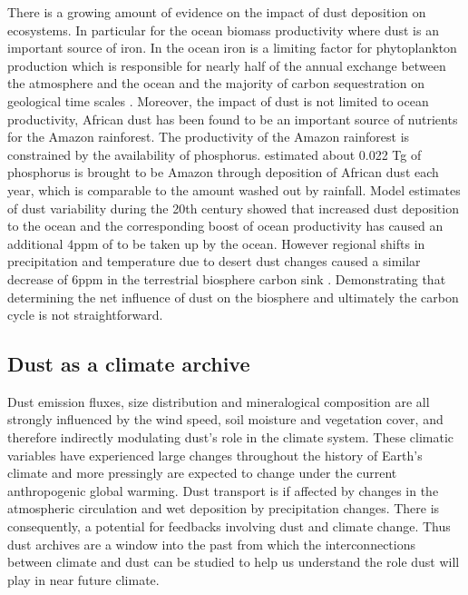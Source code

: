 There is a growing amount of evidence on the impact of dust deposition on ecosystems. In particular for the ocean biomass productivity where dust is an important source of iron. In the ocean iron is a limiting factor for phytoplankton production which is responsible for nearly half of the annual  exchange between the atmosphere and the ocean and the majority of carbon sequestration on geological time scales \parencite{shao2011dust}. Moreover, the impact of dust is not limited to ocean productivity, African dust has been found to be an important source of nutrients for the Amazon rainforest. The productivity of the Amazon rainforest is constrained by the availability of phosphorus. \textcite{yu2015fertilizing} estimated about 0.022 Tg of phosphorus is brought to be Amazon through deposition of African dust each year, which is comparable to the amount washed out by rainfall. Model estimates of dust variability during the 20th century showed that increased dust deposition to the ocean and the corresponding boost of ocean productivity has caused an additional 4ppm of  to be taken up by the ocean. However regional shifts in precipitation and temperature due to desert dust changes caused a similar decrease of 6ppm  in the terrestrial biosphere carbon sink \parencite{mahowald2010observed}. Demonstrating that determining the net influence of dust on the biosphere and ultimately the carbon cycle is not straightforward.
\subsection{Dust as a climate archive}
Dust emission fluxes, size distribution and mineralogical composition are all strongly influenced by the wind speed, soil moisture and vegetation cover, and therefore indirectly modulating dust's role in the climate system. 
These climatic variables have experienced large changes throughout the history of Earth's climate and more pressingly are expected to change under the current anthropogenic global warming. Dust transport is if affected by changes in the atmospheric circulation and wet deposition by precipitation changes. There is consequently,
a potential for feedbacks involving dust and climate change. Thus dust archives are a window into the past from which the interconnections between climate and dust can be studied to help us understand the role dust will play in near future climate. 

